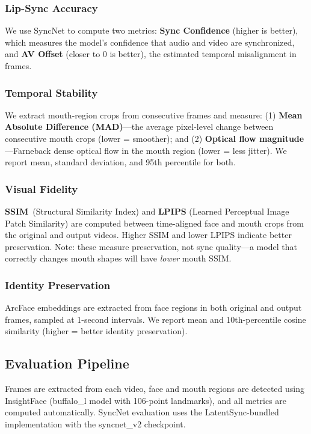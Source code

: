 \documentclass[11pt,a4paper]{article}
\begin{document}
\subsubsection{Lip-Sync Accuracy}
We use SyncNet to compute two metrics: \textbf{Sync Confidence}
(higher is better), which measures the model's confidence that audio and video
are synchronized, and \textbf{AV Offset} (closer to 0 is better), the estimated
temporal misalignment in frames.

\subsubsection{Temporal Stability}
We extract mouth-region crops from consecutive frames and measure:
(1) \textbf{Mean Absolute Difference (MAD)}---the average pixel-level change
between consecutive mouth crops (lower = smoother); and
(2) \textbf{Optical flow magnitude}---Farneback dense optical flow in the
mouth region (lower = less jitter). We report mean, standard deviation, and
95th percentile for both.

\subsubsection{Visual Fidelity}
\textbf{SSIM}~(Structural Similarity Index) and \textbf{LPIPS}
(Learned Perceptual Image Patch Similarity) are computed between time-aligned
face and mouth crops from the original and output videos. Higher SSIM and
lower LPIPS indicate better preservation. Note: these measure preservation,
not sync quality---a model that correctly changes mouth shapes will have
\emph{lower} mouth SSIM.

\subsubsection{Identity Preservation}
ArcFace embeddings are extracted from face regions in both
original and output frames, sampled at 1-second intervals. We report mean
and 10th-percentile cosine similarity (higher = better identity preservation).

\subsection{Evaluation Pipeline}
Frames are extracted from each video, face and mouth regions are detected
using InsightFace (buffalo\_l model with 106-point landmarks), and all metrics
are computed automatically. SyncNet evaluation uses the LatentSync-bundled
implementation with the syncnet\_v2 checkpoint.
\end{document}
